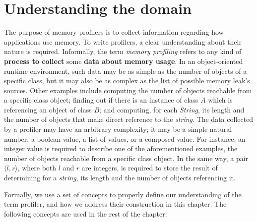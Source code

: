 
\section{Understanding the domain} \label{sec:domain-overview}

The purpose of memory profilers is to collect information regarding how applications use memory.
To write profilers, a clear understanding about their nature is required.
Informally, the term \textit{memory profiling} refers to any kind of \textbf{process to collect} some \textbf{data about memory usage}.
In an object-oriented runtime environment, such data may be as simple as the number of objects of a specific class, but it may also be as complex as the list of possible memory leak's sources.
Other examples include computing the number of objects reachable from a specific class object; finding out if there is an instance of class $A$ which is referencing an object of class $B$; and computing, for each \textit{String}, its length and the number of objects that make direct reference to the \textit{string}.
The data collected by a profiler may have an arbitrary complexity; it may be a simple natural number, a boolean value, a list of values, or a composed value.
For instance, an integer value is required to describe one of the aforementioned examples, the number of objects reachable from a specific class object.
In the same way, a pair $\langle l,r \rangle$, where both $l$ and $r$ are integers, is required to store the result of determining for a \textit{string}, its length and the number of objects referencing it.


Formally, we use a set of concepts to properly define our understanding of the term profiler, and how we address their construction in this chapter.
The following concepts are used in the rest of the chapter:

